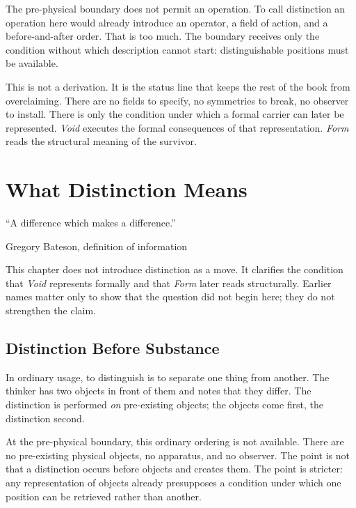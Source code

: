 \documentclass[11pt,a4paper]{book}
\begin{document}
The pre-physical boundary does not permit an operation. To call distinction an operation here would already introduce an operator, a field of action, and a before-and-after order. That is too much. The boundary receives only the condition without which description cannot start: distinguishable positions must be available.

This is not a derivation. It is the status line that keeps the rest of the book from overclaiming. There are no fields to specify, no symmetries to break, no observer to install. There is only the condition under which a formal carrier can later be represented. \textit{Void} executes the formal consequences of that representation. \textit{Form} reads the structural meaning of the survivor.

\chapter{What Distinction Means}
\label{ch:what-distinction-means}

\epigraph{``A difference which makes a difference.''}{Gregory Bateson, definition of information}

This chapter does not introduce distinction as a move. It clarifies the condition that \textit{Void} represents formally and that \textit{Form} later reads structurally. Earlier names matter only to show that the question did not begin here; they do not strengthen the claim.

\section*{Distinction Before Substance}

In ordinary usage, to distinguish is to separate one thing from another. The thinker has two objects in front of them and notes that they differ. The distinction is performed \emph{on} pre-existing objects; the objects come first, the distinction second.

At the pre-physical boundary, this ordinary ordering is not available. There are no pre-existing physical objects, no apparatus, and no observer. The point is not that a distinction occurs before objects and creates them. The point is stricter: any representation of objects already presupposes a condition under which one position can be retrieved rather than another.
\end{document}
